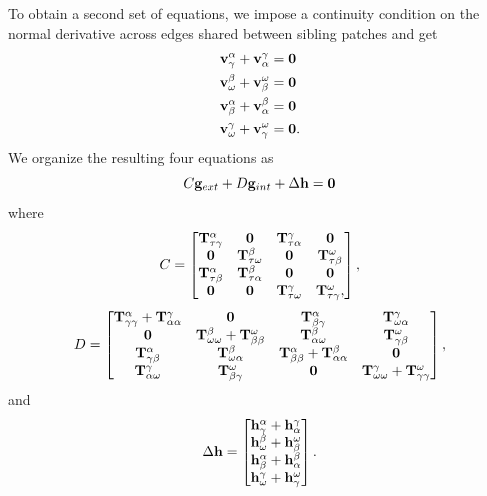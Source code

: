 To obtain a second set of equations, we impose a continuity condition on the normal derivative across edges shared between sibling patches and get
\begin{equation}
\begin{aligned}
\mathbf v^{\alpha}_{\gamma} + \mathbf v^{\gamma}_{\alpha} & = \mathbf 0 \\
\mathbf v^{\beta}_{\omega} + \mathbf v^{\omega}_{\beta} & = \mathbf 0 \\
\mathbf v^{\alpha}_{\beta}  + \mathbf v^{\beta}_{\alpha} & = \mathbf 0\\
\mathbf v^{\gamma}_{\omega} + \mathbf v^{\omega}_{\gamma} & = \mathbf 0.
\end{aligned}
\end{equation}
We organize the resulting four equations as
\begin{equation}
C \mathbf g_{ext} + D\mathbf g_{int}  + \Delta \mathbf h = \mathbf 0
\label{eq:sys_two}
\end{equation}
where
\begin{equation}
C = 
\begin{bmatrix}
\mathbf T^{\alpha}_{\tau\gamma} & \mathbf 0               & \mathbf T^{\gamma}_{\tau\alpha} & \mathbf 0 \\
\mathbf 0               & \mathbf T^{\beta}_{\tau\omega}  & \mathbf 0                & \mathbf T^{\omega}_{\tau\beta} \\ 
\mathbf T^{\alpha}_{\tau\beta}  & \mathbf T^{\beta}_{\tau\alpha} & \mathbf 0                & \mathbf 0 \\
\mathbf 0               & \mathbf 0               & \mathbf T^{\gamma}_{\tau\omega}  & \mathbf T^{\omega}_{\tau\gamma},
\end{bmatrix},
\end{equation}
\begin{equation}
D = \begin{bmatrix}
\Talphap{\gamma}{\gamma} + \Tgammap{\alpha}{\alpha} 
& \zeromat 
& \Talphap{\beta}{\gamma} 
& \Tgammap{\omega}{\alpha} \\
% 
\zeromat 
& \Tbetap{\omega}{\omega} + \Tomegap{\beta}{\beta} 
& \Tbetap{\alpha}{\omega} 
& \Tomegap{\gamma}{\beta} \\
% 
\Talphap{\gamma}{\beta} 
& \Tbetap{\omega}{\alpha} 
& \Talphap{\beta}{\beta}+ \Tbetap{\alpha}{\alpha} 
& \zeromat \\
% 
\Tgammap{\alpha}{\omega} 
& \Tomegap{\beta}{\gamma} 
& \zeromat 
& \Tgammap{\omega}{\omega} + \Tomegap{\gamma}{\gamma}
\end{bmatrix},
\label{eq:matrix_CD}
\end{equation}
and 
\begin{equation}
\Delta \mathbf h = 
\begin{bmatrix}
\mathbf h^{\alpha}_{\gamma} + \mathbf h^{\gamma}_{\alpha} \\
\mathbf h^{\beta}_{\omega} + \mathbf h^{\omega}_{\beta} \\
\mathbf h^{\alpha}_{\beta} + \mathbf h^{\beta}_{\alpha} \\
\mathbf h^{\gamma}_{\omega} + \mathbf h^{\omega}_{\gamma}
\end{bmatrix}.
\label{eq:h_diff}
\end{equation}

